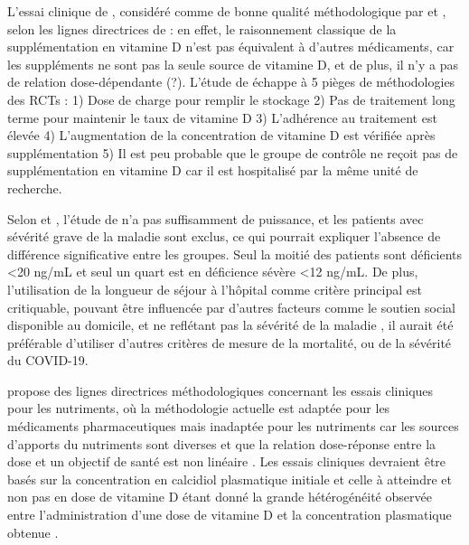 \documentclass[
  a4paper,
  DIV=11,
  numbers=noendperiod,
  listof=totoc]{scrreprt}
\begin{document}
L'essai clinique de \textcite{Murai.2021}, considéré comme de bonne
qualité méthodologique par \textcite{Annweiler.2021} et
\textcite{Argano.2023}, selon les lignes directrices de
\textcite{Heaney.2014} : en effet, le raisonnement classique de la
supplémentation en vitamine D n'est pas équivalent à d'autres
médicaments, car les suppléments ne sont pas la seule source de vitamine
D, et de plus, il n'y a pas de relation dose-dépendante (?). L'étude de
\textcite{Murai.2021} échappe à 5 pièges de méthodologies des \acp{RCT}
: 1) Dose de charge pour remplir le stockage 2) Pas de traitement long
terme pour maintenir le taux de vitamine D 3) L'adhérence au traitement
est élevée 4) L'augmentation de la concentration de vitamine D est
vérifiée après supplémentation 5) Il est peu probable que le groupe de
contrôle ne reçoit pas de supplémentation en vitamine D car il est
hospitalisé par la même unité de recherche.

Selon \textcite{Leaf.2021} et \textcite{Annweiler.2021}, l'étude de
\textcite{Murai.2021} n'a pas suffisamment de puissance, et les patients
avec sévérité grave de la maladie sont exclus, ce qui pourrait expliquer
l'absence de différence significative entre les groupes. Seul la moitié
des patients sont déficients \textless20 ng/mL et seul un quart est en
déficience sévère \textless12 ng/mL. De plus, l'utilisation de la
longueur de séjour à l'hôpital comme critère principal est critiquable,
pouvant être influencée par d'autres facteurs comme le soutien social
disponible au domicile, et ne reflétant pas la sévérité de la maladie
\autocite{Annweiler.2021}, il aurait été préférable d'utiliser d'autres
critères de mesure de la mortalité, ou de la sévérité du COVID-19.

\textcite{Heaney.2014} propose des lignes directrices méthodologiques
concernant les essais cliniques pour les nutriments, où la méthodologie
actuelle est adaptée pour les médicaments pharmaceutiques mais inadaptée
pour les nutriments car les sources d'apports du nutriments sont
diverses et que la relation dose-réponse entre la dose et un objectif de
santé est non linéaire \autocite{Grant.2022.nutrients.manual}. Les
essais cliniques devraient être basés sur la concentration en calcidiol
plasmatique initiale et celle à atteindre et non pas en dose de vitamine
D étant donné la grande hétérogénéité observée entre l'administration
d'une dose de vitamine D et la concentration plasmatique obtenue
\autocite{Grant.2022.nutrients.manual}.
\end{document}
